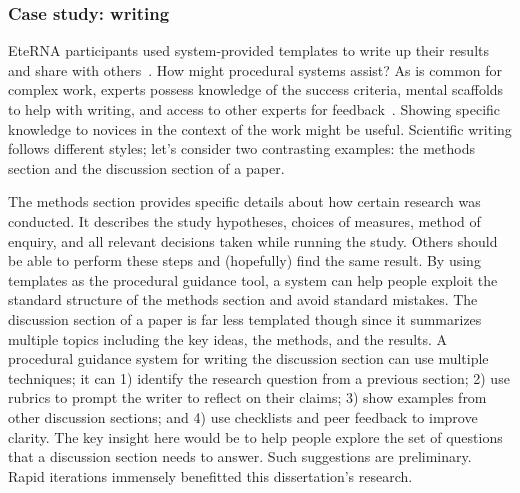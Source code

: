 \subsubsection{Case study: writing}
EteRNA participants used system-provided templates to write up their results and share with others~\cite{Lee2014}. How might procedural systems assist? As is common for complex work, experts possess knowledge of the success criteria, mental scaffolds to help with writing, and access to other experts for feedback~\cite{kellogg2006professional}. Showing specific knowledge to novices in the context of the work might be useful. Scientific writing follows different styles; let’s consider two contrasting examples: the methods section and the discussion section of a paper.

The methods section provides specific details about how certain research was conducted. It describes the study hypotheses, choices of measures, method of enquiry, and all relevant decisions taken while running the study. Others should be able to perform these steps and (hopefully) find the same result. By using templates as the procedural guidance tool, a system can help people exploit the standard structure of the methods section and avoid standard mistakes. The discussion section of a paper is far less templated though since it summarizes multiple topics including the key ideas, the methods, and the results. A procedural guidance system for writing the discussion section can use multiple techniques; it can 1) identify the research question from a previous section; 2) use rubrics to prompt the writer to reflect on their claims; 3) show examples from other discussion sections; and 4) use checklists and peer feedback to improve clarity. The key insight here would be to help people explore the set of questions that a discussion section needs to answer. Such suggestions are preliminary. Rapid iterations immensely benefitted this dissertation's research.

